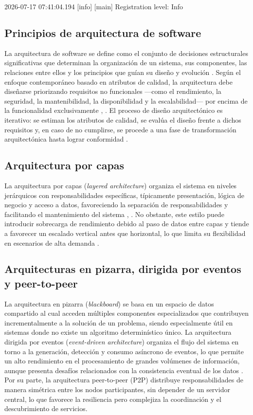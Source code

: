 2026-07-17 07:41:04.194 [info] [main] Registration level: Info

\subsection{Principios de arquitectura de software}

La arquitectura de software se define como el conjunto de decisiones estructurales significativas que determinan la organización de un sistema, sus componentes, las relaciones entre ellos y los principios que guían su diseño y evolución \cite{tecnovy_arch}. Según el enfoque contemporáneo basado en atributos de calidad, la arquitectura debe diseñarse priorizando requisitos no funcionales —como el rendimiento, la seguridad, la mantenibilidad, la disponibilidad y la escalabilidad— por encima de la funcionalidad exclusivamente \cite{arxiv_scientific_sw}, \cite{ajbas_styles}. El proceso de diseño arquitectónico es iterativo: se estiman los atributos de calidad, se evalúa el diseño frente a dichos requisitos y, en caso de no cumplirse, se procede a una fase de transformación arquitectónica hasta lograr conformidad \cite{ajbas_styles}.

\subsection{Arquitectura por capas}

La arquitectura por capas (\textit{layered architecture}) organiza el sistema en niveles jerárquicos con responsabilidades específicas, típicamente presentación, lógica de negocio y acceso a datos, favoreciendo la separación de responsabilidades y facilitando el mantenimiento del sistema \cite{lazarenko_arch}, \cite{gfg_patterns}. No obstante, este estilo puede introducir sobrecarga de rendimiento debido al paso de datos entre capas y tiende a favorecer un escalado vertical antes que horizontal, lo que limita su flexibilidad en escenarios de alta demanda \cite{vfunction_patterns}.

\subsection{Arquitecturas en pizarra, dirigida por eventos y peer-to-peer}

La arquitectura en pizarra (\textit{blackboard}) se basa en un espacio de datos compartido al cual acceden múltiples componentes especializados que contribuyen incrementalmente a la solución de un problema, siendo especialmente útil en sistemas donde no existe un algoritmo determinístico único. La arquitectura dirigida por eventos (\textit{event-driven architecture}) organiza el flujo del sistema en torno a la generación, detección y consumo asíncrono de eventos, lo que permite un alto rendimiento en el procesamiento de grandes volúmenes de información, aunque presenta desafíos relacionados con la consistencia eventual de los datos \cite{vfunction_patterns}. Por su parte, la arquitectura peer-to-peer (P2P) distribuye responsabilidades de manera simétrica entre los nodos participantes, sin depender de un servidor central, lo que favorece la resiliencia pero complejiza la coordinación y el descubrimiento de servicios.

